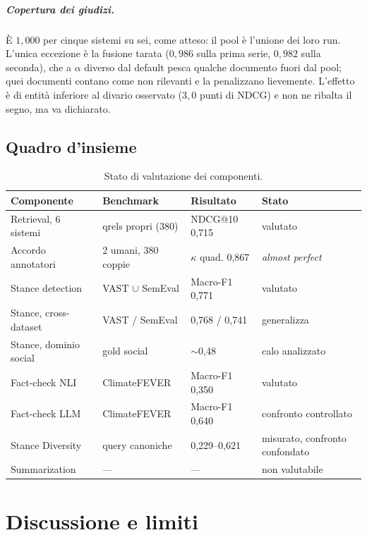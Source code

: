 \documentclass[11pt,a4paper]{report}
\begin{document}
\paragraph{Copertura dei giudizi.} È $1{,}000$ per cinque sistemi su sei, come atteso: il pool è
l'unione dei loro run. L'unica eccezione è la fusione tarata ($0{,}986$ sulla prima serie, $0{,}982$
sulla seconda), che a $\alpha$ diverso dal default pesca qualche documento fuori dal pool; quei
documenti contano come non rilevanti e la penalizzano lievemente. L'effetto è di entità inferiore
al divario osservato ($3{,}0$ punti di NDCG) e non ne ribalta il segno, ma va dichiarato.

\section{Quadro d'insieme}

\begin{table}[t]
\centering
\small
\begin{tabularx}{\textwidth}{p{3.3cm}p{2.9cm}p{2.5cm}X}
\toprule
\textbf{Componente} & \textbf{Benchmark} & \textbf{Risultato} & \textbf{Stato} \\
\midrule
Retrieval, 6 sistemi & qrels propri (380) & NDCG@10 0,715 & valutato \\
Accordo annotatori & 2 umani, 380 coppie & $\kappa$ quad. 0,867 & \emph{almost perfect} \\
Stance detection & VAST $\cup$ SemEval & Macro-F1 0,771 & valutato \\
Stance, cross-dataset & VAST / SemEval & 0,768 / 0,741 & generalizza \\
Stance, dominio social & gold social & $\sim$0,48 & calo analizzato \\
Fact-check NLI & ClimateFEVER & Macro-F1 0,350 & valutato \\
Fact-check LLM & ClimateFEVER & Macro-F1 0,640 & confronto controllato \\
Stance Diversity & query canoniche & 0,229--0,621 & misurato, confronto confondato \\
Summarization & --- & --- & non valutabile \\
\bottomrule
\end{tabularx}
\caption{Stato di valutazione dei componenti.}
\label{tab:quadro}
\end{table}

\chapter{Discussione e limiti}\label{cap:discussione}
\end{document}
